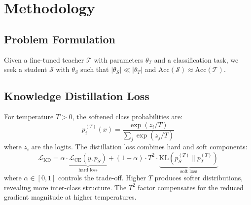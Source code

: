 \documentclass[conference]{IEEEtran}
\begin{document}
\section{Methodology}
\label{sec:method}

\subsection{Problem Formulation}

Given a fine-tuned teacher $\mathcal{T}$ with parameters $\theta_T$ and a classification task, we seek a student $\mathcal{S}$ with $\theta_S$ such that $|\theta_S| \ll |\theta_T|$ and $\text{Acc}(\mathcal{S}) \approx \text{Acc}(\mathcal{T})$.

\subsection{Knowledge Distillation Loss}

For temperature $T > 0$, the softened class probabilities are:
\begin{equation}
    p_i^{(T)}(x) = \frac{\exp(z_i / T)}{\sum_j \exp(z_j / T)}
    \label{eq:softmax}
\end{equation}
where $z_i$ are the logits. The distillation loss combines hard and soft components:
\begin{equation}
    \mathcal{L}_{\text{KD}} = \alpha \cdot \underbrace{\mathcal{L}_{\text{CE}}(y, p_S)}_{\text{hard loss}} + (1 - \alpha) \cdot T^2 \cdot \underbrace{\text{KL}(p_S^{(T)} \| p_T^{(T)})}_{\text{soft loss}}
    \label{eq:kd}
\end{equation}
where $\alpha \in [0,1]$ controls the trade-off. Higher $T$ produces softer distributions, revealing more inter-class structure. The $T^2$ factor compensates for the reduced gradient magnitude at higher temperatures.
\end{document}
